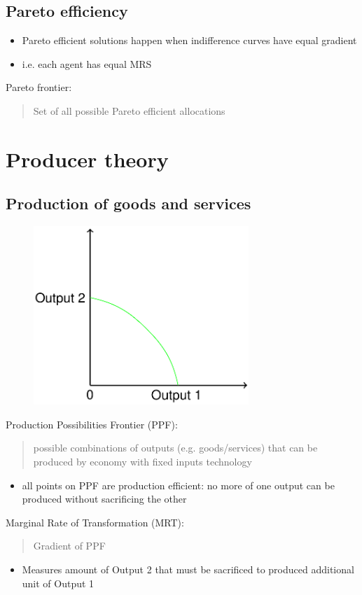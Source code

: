 \documentclass[class=report, crop=false, 12pt,a4paper]{standalone}
\begin{document}
\subsection{Pareto efficiency}
\begin{itemize}
	\item Pareto efficient solutions happen when indifference curves have equal gradient
	\item i.e. each agent has equal MRS
\end{itemize}
Pareto frontier:
\begin{quote}
	Set of all possible Pareto efficient allocations
\end{quote}
\section{Producer theory}
\subsection{Production of goods and services}
\begin{figure}[H]
	\centering
	\includegraphics[width =0.5 \textwidth]{../img/figure8.png}
	\caption{}
\end{figure}
Production Possibilities Frontier (PPF):
\begin{quote}
	possible combinations of outputs (e.g. goods/services) that can be produced by economy with fixed inputs technology
\end{quote}
\begin{itemize}
	\item all points on PPF are production efficient: no more of one output can be produced without sacrificing the other
\end{itemize}
Marginal Rate of Transformation (MRT):
\begin{quote}
	Gradient of PPF
\end{quote}
\begin{itemize}
	\item Measures amount of Output 2 that must be sacrificed to produced additional unit of Output 1
\end{itemize}
\end{document}
